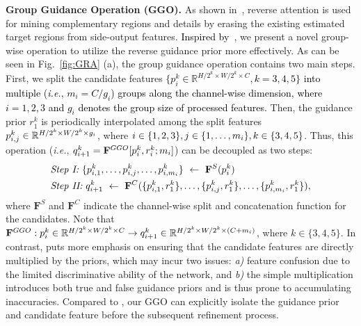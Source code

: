 \documentclass[10pt,journal,compsoc]{IEEEtran}
\def\ie{\emph{i.e.}}
\newcommand{\myPara}[1]{\vspace{6pt}\noindent\textbf{#1}\qquad }
\newcommand{\figref}[1]{Fig.~\ref{#1}}
\newcommand{\Rev}[1]{\textcolor{black}{#1}}
\begin{document}
\myPara{Group Guidance Operation (GGO).}
%
As shown in~\cite{fan2020pranet}, 
reverse attention is used for mining complementary regions and details 
by erasing the existing estimated target regions from side-output features.
\Rev{Inspired by~\cite{chen2020progressively}}, we present a novel group-wise operation to utilize 
the reverse guidance prior more effectively.
%
As can be seen in \figref{fig:GRA} (a), 
the group guidance operation contains two main steps. 
%
First, we split the candidate features \Rev{$\{ p_i^k \in \mathbb{R}^{H/2^k \times W/2^k \times C}, k=3,4,5\}$ into multiple (\ie, $m_i = C/g_i$) groups along the channel-wise dimension, where $i=1,2,3$ and $g_i$ denotes the group size of processed features.}
%
Then, the guidance prior $r_1^k$ is periodically interpolated among the 
split features $p_{i,j}^{k} \in \mathbb{R}^{H/2^k \times W/2^k \times \Rev{g_i}}$, 
where $i \in \{ 1, 2, 3 \}, j \in \{ 1,\dots,\Rev{m_i} \}, k \in \{3,4,5\}$.
%
Thus, this operation (\ie, $q_{i+1}^{k} = \mathbf{F}^{GGO}[p_i^k, r_i^k; \Rev{m_i}]$) 
can be decoupled as two steps:
%
\begin{equation} \label{RA2}
  \begin{aligned}
    &\textit{Step I:}~\{ p_{i,1}^{k}, \dots, p_{i,j}^{k} , \dots , p_{i,\Rev{m_i}}^{k} \}~\gets~\mathbf{F}^S(p_i^k)\\
    &\textit{Step II:}~q_{i+1}^{k} ~\gets~\mathbf{F}^C( \{ p_{i,1}^{k}, r_1^{k} \} , \dots, \{ p_{i,j}^{k}, r_1^k \}, \dots, \{ p_{i,\Rev{m_i}}^{k}, r_1^k\} ),
  \end{aligned}
\end{equation}
%
where $\mathbf{F}^S$ and $\mathbf{F}^C$ indicate the channel-wise split 
and concatenation function for the candidates.
%
Note that $\mathbf{F}^{GGO}: p_i^k \in \mathbb{R}^{H/2^k \times W/2^k \times C} 
\rightarrow q_{i+1}^{k} \in \mathbb{R}^{H/2^k \times W/2^k \times (C+\Rev{m_i})}$, 
where $k \in \{3,4,5\}$.
%
In contrast, \cite{fan2020pranet} puts more emphasis on ensuring that the 
candidate features are directly multiplied by the priors, 
which may incur two issues:
%
\textit{a)} feature confusion due to the limited discriminative ability of 
the network, and 
%
\textit{b)} the simple multiplication introduces both true and false guidance 
priors and is thus prone to accumulating inaccuracies.
%
Compared to \cite{fan2020pranet}, our GGO can explicitly isolate the guidance 
prior and candidate feature before the subsequent refinement process.
\end{document}
